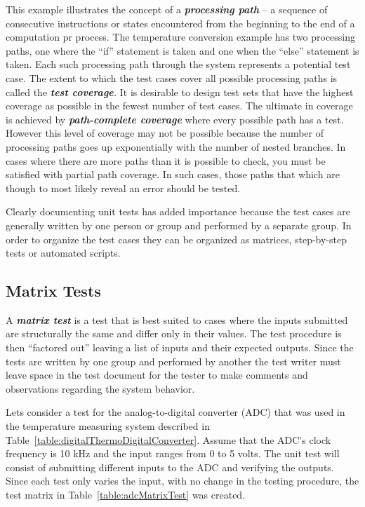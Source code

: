 This example illustrates the concept of a \emph{\textbf{processing
path}} -- a sequence of consecutive instructions or states encountered
from the beginning to the end of a computation pr process. The
temperature conversion example has two processing paths, one where the
``if'' statement is taken and one when the ``else'' statement is taken.
Each such processing path through the system represents a potential test
case. The extent to which the test cases cover all possible processing
paths is called the \emph{\textbf{test coverage}.} It is desirable to
design test sets that have the highest coverage as possible in the
fewest number of test cases. The ultimate in coverage is achieved by
\textbf{\emph{path-complete coverage}} where every possible path has a
test. However this level of coverage may not be possible because the
number of processing paths goes up exponentially with the number of
nested branches. In cases where there are more paths than it is possible
to check, you must be satisfied with partial path coverage. In such
cases, those paths that which are though to most likely reveal an error
should be tested.

Clearly documenting unit tests has added importance because the test
cases are generally written by one person or group and performed by a
separate group. In order to organize the test cases they can be
organized as matrices, step-by-step tests or automated scripts.

\subsection*{Matrix Tests}
\label{subsection:matrix-tests}

A \emph{\textbf{matrix test}} is a test that is best suited to cases
where the inputs submitted are structurally the same and differ only in
their values. The test procedure is then ``factored out'' leaving a list
of inputs and their expected outputs. Since the tests are written by one
group and performed by another the test writer must leave space in the
test document for the tester to make comments and observations regarding
the system behavior.

Lets consider a test for the analog-to-digital converter (ADC) that was
used in the temperature measuring system described in 
Table~\ref{table:digitalThermoDigitalConverter}. 
Assume that the ADC's clock frequency is 10 kHz and the
input ranges from 0 to 5 volts. The unit test will consist of submitting
different inputs to the ADC and verifying the outputs. Since each test
only varies the input, with no change in the testing procedure, the test
matrix in Table~\ref{table:adcMatrixTest} was created.


